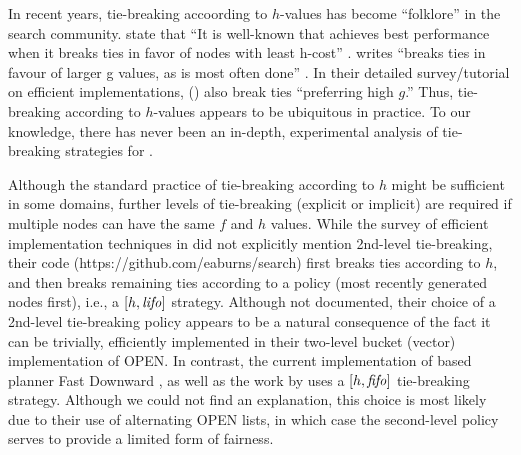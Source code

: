 In recent years, tie-breaking accoording to $h$-values has become ``folklore'' in the search community.
\citeauthor{hansen2007anytime} state that ``It is well-known 
that \astar achieves best performance when it breaks ties
in favor of nodes with least h-cost'' \cite{hansen2007anytime}.
\citeauthor{holte2010common} writes ``\astar breaks ties in favour
of larger g values, as is most often done'' \cite[note that since $f=g+h$,
preferring large $g$ is equivalent to preferring smaller $h$]{holte2010common}.
In their detailed survey/tutorial on efficient \astar implementations,
\citeauthor{burns2012implementing} (\citeyear{burns2012implementing})
also break ties ``preferring high $g$.''
Thus, tie-breaking according to $h$-values appears
to be ubiquitous in practice.
To our knowledge, there has never been an in-depth, experimental analysis of tie-breaking strategies for \astar.

Although the standard practice of tie-breaking according to $h$ might be
sufficient in some domains, further levels of tie-breaking (explicit or
implicit) are required if multiple nodes can have the same $f$ and
$h$ values.
While the survey of efficient \astar implementation techniques in
\cite{burns2012implementing} did not explicitly mention 2nd-level
tie-breaking, their code ({\footnotesize https://github.com/eaburns/search})
first breaks ties according to $h$, and then
breaks remaining ties according to a \lifo policy (most recently
generated nodes first), i.e., a $[h,\mbox{\textit{lifo}}]$ strategy.
Although not documented, their choice of a \lifo 2nd-level tie-breaking policy appears to be a natural consequence of the fact it can be trivially, efficiently implemented in their two-level bucket (vector) implementation of OPEN.
In contrast, the current implementation of \sota \astar based planner Fast
Downward \cite{Helmert2006}, %
as well as 
the work by \cite{RogerH10} uses a $[h,\mbox{\textit{fifo}}]$ tie-breaking strategy.
Although we could not find an explanation, this choice is most likely due to their use of alternating OPEN lists, in which case the \fifo second-level policy serves to provide a limited form of fairness.


